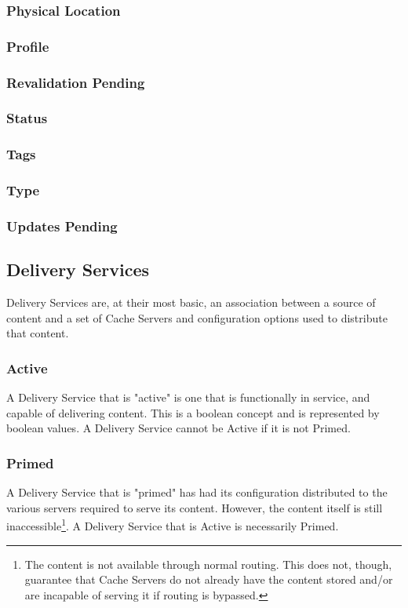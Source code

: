 \subsubsection{Physical Location}

\subsubsection{Profile}

\subsubsection{Revalidation Pending}

\subsubsection{Status}

\subsubsection{Tags}

\subsubsection{Type}

\subsubsection{Updates Pending}



\subsection{Delivery Services}
Delivery Services are, at their most basic, an association between a source of
content and a set of Cache Servers and configuration options used to distribute
that content.

\subsubsection{Active}
A Delivery Service that is "active" is one that is functionally in service, and
capable of delivering content. This is a boolean concept and is represented by
boolean values. A Delivery Service cannot be Active if it is not Primed.

\subsubsection{Primed}
A Delivery Service that is "primed" has had its configuration distributed to the
various servers required to serve its content. However, the content itself is
still inaccessible\footnote{The content is not available through normal routing.
This does not, though, guarantee that Cache Servers do not already have the
content stored and/or are incapable of serving it if routing is bypassed.}. A
Delivery Service that is Active is necessarily Primed.



